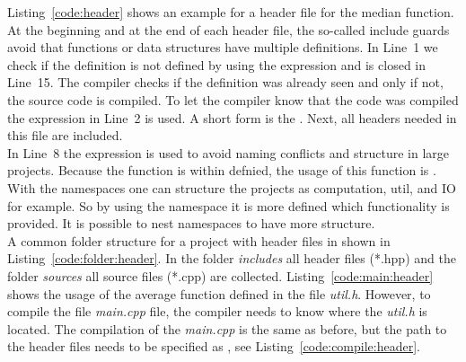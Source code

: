 Listing~\ref{code:header} shows an example for a header file for the median function. At the beginning and at the end of each header file, the so-called include guards avoid that functions or data structures have multiple definitions. In Line~1 we check if the definition  is not defined by using the expression  and is closed in Line~15. The compiler checks if the  definition  was already seen and only if not, the source code is compiled. To let the compiler know that the code was compiled the expression  in Line~2 is used. A short form is the . Next, all headers needed in this file are included.\\

In Line~8 the  expression is used to avoid naming conflicts and structure in large projects. Because the function  is within  defnied, the usage of this function is . With the namespaces one can structure the projects as computation, util, and IO for example. So by using the namespace it is more defined which functionality is provided. It is possible to nest namespaces to have more structure.\\

A common folder structure for a project with header files in shown in Listing~\ref{code:folder:header}. In the folder \textit{includes} all header files (*.hpp) and the folder \textit{sources} all source files (*.cpp) are collected. Listing~\ref{code:main:header} shows the usage of the average function defined in the file \textit{util.h}. However, to compile the file \textit{main.cpp} file, the compiler needs to know where the \textit{util.h} is located. The compilation of the \textit{main.cpp} is the same as before, but the path to the header files needs to be specified as , see Listing~\ref{code:compile:header}.

